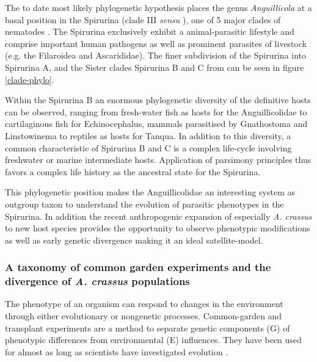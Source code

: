 The to date most likely phylogenetic hypothesis places the genus
\textit{Anguillicola} at a basal position in the Spirurina (clade III
\textit{sensu} \cite{blaxter_molecular_1998}), one of 5 major clades
of nematodes \cite{nadler_molecular_2007,
  wijov_evolutionary_2006}. The Spirurina exclusively exhibit a
animal-parasitic lifestyle and comprise important human pathogens as
well as prominent parasites of livestock (e.g. the Filaroidea and
Ascarididae). The finer subdivision of the Spirurina into Spirurina A,
and the Sister clades Spirurina B and C from \cite{dl_py} can be seen
in figure \ref{clade-phylo}.


Within the Spirurina B an enormous phylogenetic diversity of the
definitive hosts can be observed, ranging from fresh-water fish as
hosts for the Anguillicolidae to cartilaginous fish for
Echinocephalus, mammals parasitised by Gnathostoma and Linstowinema to
reptiles as hosts for Tanqua. In addition to this diversity, a common
characteristic of Spirurina B and C is a complex life-cycle involving
freshwater or marine intermediate hosts. Application of parsimony
principles thus favors a complex life history as the ancestral state
for the Spirurina.

This phylogenetic position makes the Anguillicolidae an interesting
system as outgroup taxon to understand the evolution of parasitic
phenotypes in the Spirurina. In addition the recent anthropogenic
expansion of especially \textit{A. crassus} to new host species
provides the opportunity to observe phenotypic modifications as well
as early genetic divergence making it an ideal satellite-model.

\subsubsection{A taxonomy of common garden experiments and the
  divergence of \textit{A. crassus} populations}
\label{div-ac}

The phenotype of an organism can respond to changes in the environment
through either evolutionary or nongenetic processes. Common-garden and
transplant experiments are a method to separate genetic components (G)
of phenotypic differences from environmental (E) influences. They have
been used for almost as long as scientists have investigated evolution
\cite{kerner_classic_common_garden, bonnier_classic_common_garden}.

